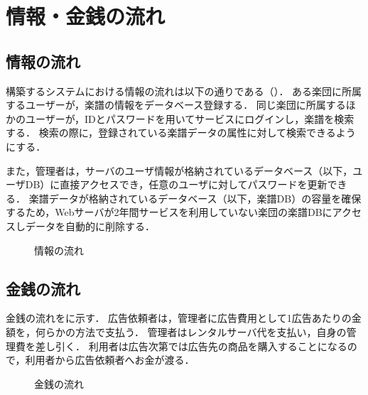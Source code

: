 \chapter{情報・金銭の流れ}
\section*{情報の流れ}\label{sec:情報の流れ}
構築するシステムにおける情報の流れは以下の通りである（）．
ある楽団に所属するユーザーが，楽譜の情報をデータベース登録する．
同じ楽団に所属するほかのユーザーが，IDとパスワードを用いてサービスにログインし，楽譜を検索する．
検索の際に，登録されている楽譜データの属性に対して検索できるようにする．\par
また，管理者は，サーバのユーザ情報が格納されているデータベース（以下，ユーザDB）に直接アクセスでき，任意のユーザに対してパスワードを更新できる．
楽譜データが格納されているデータベース（以下，楽譜DB）の容量を確保するため，Webサーバが2年間サービスを利用していない楽団の楽譜DBにアクセスしデータを自動的に削除する．
\begin{figure}[p]
    \centering
    
    \caption{情報の流れ}
    \label{fig:情報の流れ}
\end{figure}
\section*{金銭の流れ}\label{sec:金銭の流れ}
金銭の流れをに示す．
広告依頼者は，管理者に広告費用として1広告あたりの金額を，何らかの方法で支払う．
管理者はレンタルサーバ代を支払い，自身の管理費を差し引く．
利用者は広告次第では広告先の商品を購入することになるので，利用者から広告依頼者へお金が渡る．
\begin{figure}[p]
    \centering
    
    \caption{金銭の流れ}
    \label{fig:金銭の流れ}
\end{figure}